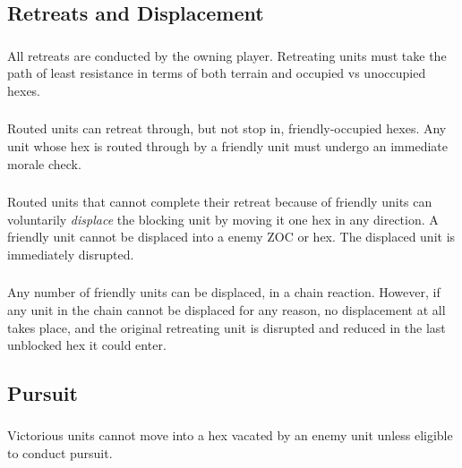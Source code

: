 \subsection{Retreats and Displacement}

\subsubsection[Owning Player]{} All retreats are conducted by the owning player. Retreating units must take the path of least resistance in terms of both terrain and occupied vs unoccupied hexes.

\subsubsection[Routed Units]{} Routed units can retreat through, but not stop in, friendly-occupied hexes. Any unit whose hex is routed through by a friendly unit must undergo an immediate morale check.

\subsubsection[Blocked Retreat]{} Routed units that cannot complete their retreat because of friendly units can voluntarily \textit{displace} the blocking unit by moving it one hex in any direction. A friendly unit cannot be displaced into a enemy ZOC or hex. The displaced unit is immediately disrupted.

\subsubsection[Displacement]{} Any number of friendly units can be displaced, in a chain reaction. However, if any unit in the chain cannot be displaced for any reason, no displacement at all takes place, and the original retreating unit is disrupted and reduced in the last unblocked hex it could enter.

\subsection{Pursuit}

\subsubsection[No Advance]{} Victorious units cannot move into a hex vacated by an enemy unit unless eligible to conduct pursuit.

